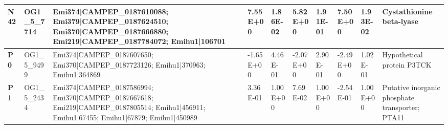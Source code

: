 \begin{landscape}
\begin{center}
\begin{footnotesize}
\begin{longtable}{|p{0.5cm}|p{1.5cm}|p{4cm}|l|l|l|l|l|l|l|}
\textbf{N42} & OG1\_5\_7714  & Emi374|CAMPEP\_0187610088; Emi379|CAMPEP\_0187624510; Emi370|CAMPEP\_0187666880; Emi219|CAMPEP\_0187784072; Emihu1|106701                                                                                                                                                                                                                                                                                                                                                                                                                                                                                                                & 7.55E+00  & 1.86E-02 & 5.82E+00  & 1.91E-01 & 7.50E+00  & 1.93E-02 & Cystathionine beta-lyase                                                     \\ \hline
\textbf{P0}  & OG1\_5\_9499  & Emi374|CAMPEP\_0187607650; Emi370|CAMPEP\_0187723126; Emihu1|370963; Emihu1|364869                                                                                                                                                                                                                                                                                                                                                                                                                                                                                                                                                       & -1.65E+00 & 4.46E-01 & -2.07E+00 & 2.90E-01 & -2.49E+00 & 1.02E-01 & Hypothetical protein P3TCK                                                   \\ \hline
\textbf{P1}  & OG1\_5\_2434  & Emi374|CAMPEP\_0187586994; Emi370|CAMPEP\_0187667618; Emi219|CAMPEP\_0187805514; Emihu1|456911; Emihu1|67455; Emihu1|67879; Emihu1|450989                                                                                                                                                                                                                                                                                                                                                                                                                                                                                                & 3.36E-01  & 1.00E+00 & 7.69E-02  & 1.00E+00 & -2.54E-01 & 1.00E+00 & Putative inorganic phosphate transporter; PTA11                              \\ \hline

\end{longtable}
\end{footnotesize}
\end{center}
\end{landscape}
